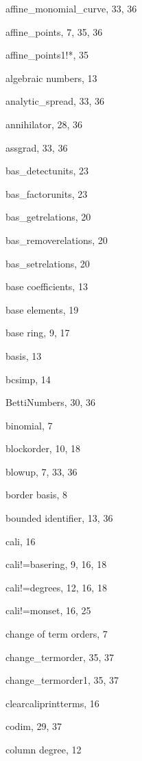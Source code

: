 \documentclass[a4paper,11pt]{article}
\begin{document}
\begin{theindex}

  \item affine\_monomial\_curve, 33, 36
  \item affine\_points, 7, 35, 36
  \item affine\_points1!*, 35
  \item algebraic numbers, 13
  \item analytic\_spread, 33, 36
  \item annihilator, 28, 36
  \item assgrad, 33, 36

  \indexspace

  \item bas\_detectunits, 23
  \item bas\_factorunits, 23
  \item bas\_getrelations, 20
  \item bas\_removerelations, 20
  \item bas\_setrelations, 20
  \item base coefficients, 13
  \item base elements, 19
  \item base ring, 9, 17
  \item basis, 13
  \item bcsimp, 14
  \item BettiNumbers, 30, 36
  \item binomial, 7
  \item blockorder, 10, 18
  \item blowup, 7, 33, 36
  \item border basis, 8
  \item bounded identifier, 13, 36

  \indexspace

  \item cali, 16
  \item cali!=basering, 9, 16, 18
  \item cali!=degrees, 12, 16, 18
  \item cali!=monset, 16, 25
  \item change of term orders, 7
  \item change\_termorder, 35, 37
  \item change\_termorder1, 35, 37
  \item clearcaliprintterms, 16
  \item codim, 29, 37
  \item column degree, 12

  \indexspace


\end{theindex}
\end{document}
